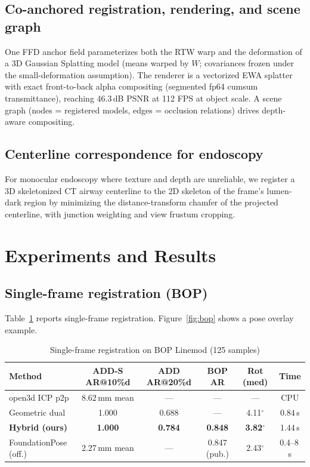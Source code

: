 \documentclass[journal]{IEEEtran}
\begin{document}
\subsection{Co-anchored registration, rendering, and scene graph}
One FFD anchor field parameterizes both the RTW warp and the deformation of a 3D Gaussian Splatting model (means warped by $W$; covariances frozen under the small-deformation assumption). The renderer is a vectorized EWA splatter with exact front-to-back alpha compositing (segmented fp64 cumsum transmittance), reaching 46.3\,dB PSNR at 112 FPS at object scale. A scene graph (nodes = registered models, edges = occlusion relations) drives depth-aware compositing.

\subsection{Centerline correspondence for endoscopy}
For monocular endoscopy where texture and depth are unreliable, we register a 3D skeletonized CT airway centerline to the 2D skeleton of the frame's lumen-dark region by minimizing the distance-transform chamfer of the projected centerline, with junction weighting and view frustum cropping.

\section{Experiments and Results}
\subsection{Single-frame registration (BOP)}
Table~\ref{tab:bop} reports single-frame registration. Figure~\ref{fig:bop} shows a pose overlay example.

\begin{table}[htbp]
\centering
\caption{Single-frame registration on BOP Linemod (125 samples)}
\label{tab:bop}
\begin{tabular}{lccccc}
\toprule
Method & ADD-S AR@10\%d & ADD AR@20\%d & BOP AR & Rot (med) & Time \\
\midrule
open3d ICP p2p & 8.62\,mm mean & --- & --- & --- & CPU \\
Geometric dual & 1.000 & 0.688 & --- & 4.11$^{\circ}$ & 0.84\,s \\
\textbf{Hybrid (ours)} & \textbf{1.000} & \textbf{0.784} & \textbf{0.848} & \textbf{3.82}$^{\circ}$ & 1.44\,s \\
FoundationPose (off.) & 2.27\,mm mean & --- & 0.847 (pub.) & 2.43$^{\circ}$ & 0.4--8\,s \\
\bottomrule
\end{tabular}
\end{table}
\end{document}
